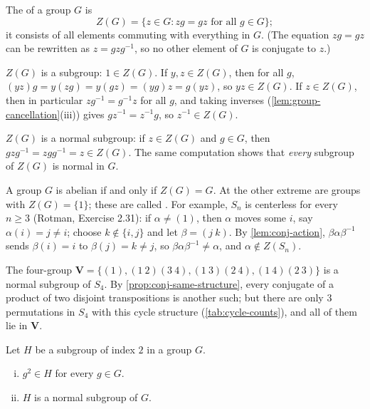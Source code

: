 \begin{eg}\label{eg:center}
	The  of a group \(G\) is
	\[
		Z(G) = \{z \in G : zg = gz \text{ for all } g \in G\};
	\]
	it consists of all elements commuting with everything in \(G\). (The equation
	\(zg = gz\) can be rewritten as \(z = gzg^{-1}\), so no other element of \(G\) is
	conjugate to \(z\).)

	\(Z(G)\) is a subgroup: \(1 \in Z(G)\). If \(y, z \in Z(G)\), then for all \(g\),
	\((yz)g = y(zg) = y(gz) = (yg)z = g(yz)\), so \(yz \in Z(G)\). If \(z \in Z(G)\), then
	in particular \(zg^{-1} = g^{-1}z\) for all \(g\), and taking inverses
	(\autoref{lem:group-cancellation}(iii)) gives \(gz^{-1} = z^{-1}g\), so
	\(z^{-1} \in Z(G)\).

	\(Z(G)\) is a normal subgroup: if \(z \in Z(G)\) and \(g \in G\), then
	\(gzg^{-1} = zgg^{-1} = z \in Z(G)\). The same computation shows that \emph{every}
	subgroup of \(Z(G)\) is normal in \(G\).

	A group \(G\) is abelian if and only if \(Z(G) = G\). At the other extreme are groups with
	\(Z(G) = \{1\}\); these are called . For example, \(S_n\) is centerless
	for every \(n \geq 3\) (Rotman, Exercise 2.31): if \(\alpha \neq (1)\), then \(\alpha\)
	moves some \(i\), say \(\alpha(i) = j \neq i\); choose \(k \notin \{i, j\}\) and let
	\(\beta = (j\ k)\). By \autoref{lem:conj-action}, \(\beta\alpha\beta^{-1}\) sends
	\(\beta(i) = i\) to \(\beta(j) = k \neq j\), so \(\beta\alpha\beta^{-1} \neq \alpha\),
	and \(\alpha \notin Z(S_n)\).
\end{eg}

\begin{eg}\label{eg:V-normal-S4}
	The four-group \(\mathbf V = \{(1), (1\ 2)(3\ 4), (1\ 3)(2\ 4), (1\ 4)(2\ 3)\}\) is a
	normal subgroup of \(S_4\). By \autoref{prop:conj-same-structure}, every conjugate of a
	product of two disjoint transpositions is another such; but there are only \(3\)
	permutations in \(S_4\) with this cycle structure (\autoref{tab:cycle-counts}), and all
	of them lie in \(\mathbf V\).
\end{eg}

\begin{proposition}\label{prop:index-two}
	Let \(H\) be a subgroup of index \(2\) in a group \(G\).
	\begin{enumerate}[(i)]
		\item \(g^2 \in H\) for every \(g \in G\).
		\item \(H\) is a normal subgroup of \(G\).
	\end{enumerate}
\end{proposition}

